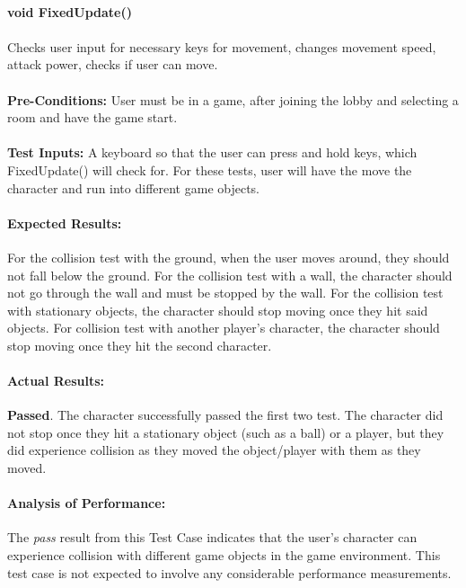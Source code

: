\documentclass{article}
\begin{document}
    \paragraph{}\textbf{void FixedUpdate()}
    \paragraph{} Checks user input for necessary keys for movement, changes movement speed, attack power, checks if user can move.
    \paragraph{}\textbf{Pre-Conditions:} User must be in a game, after joining the lobby and selecting a room and have the game start.
    \paragraph{}\textbf{Test Inputs:} A keyboard so that the user can press and hold keys, which FixedUpdate() will check for. For these tests, user will have the move the character and run into different game objects. 
    \paragraph{Expected Results:} For the collision test with the ground, when the user moves around, they should not fall below the ground. For the collision test with a wall, the character should not go through the wall and must be stopped by the wall. For the collision test with stationary objects, the character should stop moving once they hit said objects. For collision test with another player's character, the character should stop moving once they hit the second character. 
    \paragraph{Actual Results:} \textbf{Passed}. The character successfully passed the first two test. The character did not stop once they hit a stationary object (such as a ball) or a player, but they did experience collision as they moved the object/player with them as they moved.
    \paragraph{Analysis of Performance:} The \emph{pass} result from this Test Case indicates that the user's character can experience collision with different game objects in the game environment. This test case is not expected to involve any considerable performance measurements. 
    
\end{document}
